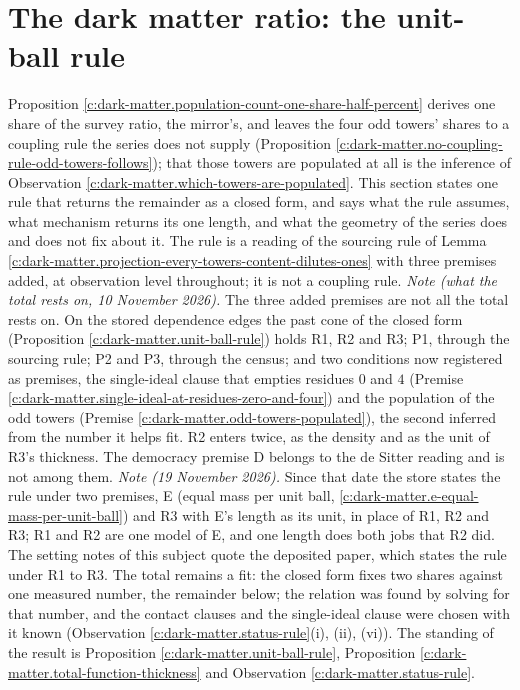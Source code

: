 \documentclass[11pt]{article}
\theoremstyle{definition}
\theoremstyle{plain}
\begin{document}
\section{The dark matter ratio: the unit-ball rule}

\label{c:note.dark-matter.setting-dark-matter-ratio-unit-ball}
Proposition \ref{c:dark-matter.population-count-one-share-half-percent} derives one share of the survey ratio, the mirror's, and leaves the four odd towers' shares to a coupling rule the series does not supply (Proposition \ref{c:dark-matter.no-coupling-rule-odd-towers-follows}); that those towers are populated at all is the inference of Observation \ref{c:dark-matter.which-towers-are-populated}. This section states one rule that returns the remainder as a closed form, and says what the rule assumes, what mechanism returns its one length, and what the geometry of the series does and does not fix about it. The rule is a reading of the sourcing rule of Lemma \ref{c:dark-matter.projection-every-towers-content-dilutes-ones} with three premises added, at observation level throughout; it is not a coupling rule. \emph{Note (what the total rests on, 10 November 2026).} The three added premises are not all the total rests on. On the stored dependence edges the past cone of the closed form (Proposition \ref{c:dark-matter.unit-ball-rule}) holds R1, R2 and R3; P1, through the sourcing rule; P2 and P3, through the census; and two conditions now registered as premises, the single-ideal clause that empties residues $0$ and $4$ (Premise \ref{c:dark-matter.single-ideal-at-residues-zero-and-four}) and the population of the odd towers (Premise \ref{c:dark-matter.odd-towers-populated}), the second inferred from the number it helps fit. R2 enters twice, as the density and as the unit of R3's thickness. The democracy premise D belongs to the de Sitter reading and is not among them. \emph{Note (19 November 2026).} Since that date the store states the rule under two premises, E (equal mass per unit ball, \ref{c:dark-matter.e-equal-mass-per-unit-ball}) and R3 with E's length as its unit, in place of R1, R2 and R3; R1 and R2 are one model of E, and one length does both jobs that R2 did. The setting notes of this subject quote the deposited paper, which states the rule under R1 to R3. The total remains a fit: the closed form fixes two shares against one measured number, the remainder below; the relation was found by solving for that number, and the contact clauses and the single-ideal clause were chosen with it known (Observation \ref{c:dark-matter.status-rule}(i), (ii), (vi)). The standing of the result is Proposition \ref{c:dark-matter.unit-ball-rule}, Proposition \ref{c:dark-matter.total-function-thickness} and Observation \ref{c:dark-matter.status-rule}.
\end{document}
